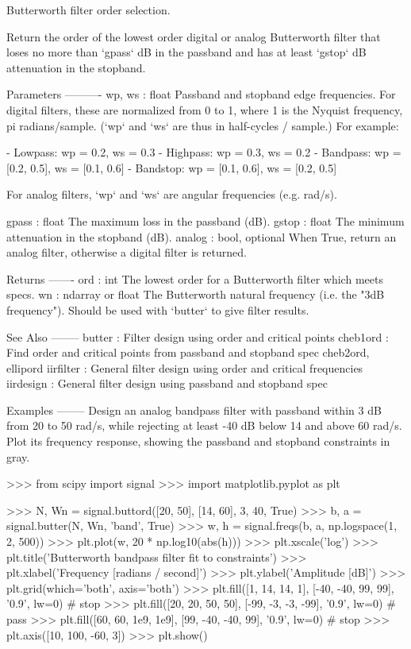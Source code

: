 \begin{DoxyVerb}Butterworth filter order selection.

Return the order of the lowest order digital or analog Butterworth filter
that loses no more than `gpass` dB in the passband and has at least
`gstop` dB attenuation in the stopband.

Parameters
----------
wp, ws : float
    Passband and stopband edge frequencies.
    For digital filters, these are normalized from 0 to 1, where 1 is the
    Nyquist frequency, pi radians/sample.  (`wp` and `ws` are thus in
    half-cycles / sample.)  For example:

        - Lowpass:   wp = 0.2,          ws = 0.3
        - Highpass:  wp = 0.3,          ws = 0.2
        - Bandpass:  wp = [0.2, 0.5],   ws = [0.1, 0.6]
        - Bandstop:  wp = [0.1, 0.6],   ws = [0.2, 0.5]

    For analog filters, `wp` and `ws` are angular frequencies (e.g. rad/s).

gpass : float
    The maximum loss in the passband (dB).
gstop : float
    The minimum attenuation in the stopband (dB).
analog : bool, optional
    When True, return an analog filter, otherwise a digital filter is
    returned.

Returns
-------
ord : int
    The lowest order for a Butterworth filter which meets specs.
wn : ndarray or float
    The Butterworth natural frequency (i.e. the "3dB frequency").  Should
    be used with `butter` to give filter results.

See Also
--------
butter : Filter design using order and critical points
cheb1ord : Find order and critical points from passband and stopband spec
cheb2ord, ellipord
iirfilter : General filter design using order and critical frequencies
iirdesign : General filter design using passband and stopband spec

Examples
--------
Design an analog bandpass filter with passband within 3 dB from 20 to
50 rad/s, while rejecting at least -40 dB below 14 and above 60 rad/s.
Plot its frequency response, showing the passband and stopband
constraints in gray.

>>> from scipy import signal
>>> import matplotlib.pyplot as plt

>>> N, Wn = signal.buttord([20, 50], [14, 60], 3, 40, True)
>>> b, a = signal.butter(N, Wn, 'band', True)
>>> w, h = signal.freqs(b, a, np.logspace(1, 2, 500))
>>> plt.plot(w, 20 * np.log10(abs(h)))
>>> plt.xscale('log')
>>> plt.title('Butterworth bandpass filter fit to constraints')
>>> plt.xlabel('Frequency [radians / second]')
>>> plt.ylabel('Amplitude [dB]')
>>> plt.grid(which='both', axis='both')
>>> plt.fill([1,  14,  14,   1], [-40, -40, 99, 99], '0.9', lw=0) # stop
>>> plt.fill([20, 20,  50,  50], [-99, -3, -3, -99], '0.9', lw=0) # pass
>>> plt.fill([60, 60, 1e9, 1e9], [99, -40, -40, 99], '0.9', lw=0) # stop
>>> plt.axis([10, 100, -60, 3])
>>> plt.show()\end{DoxyVerb}
 \hypertarget{namespacescipy_1_1signal_1_1filter__design_a95baa47fb59022eabe5199b5c497a181}{}
